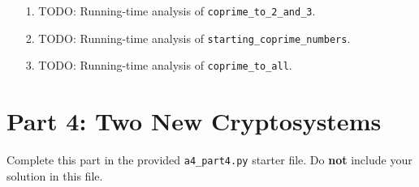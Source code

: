 \documentclass[fontsize=11pt]{article}
\begin{document}
\begin{enumerate}
\item[1.]
TODO: Running-time analysis of \texttt{coprime\_to\_2\_and\_3}.

\item[2.]
TODO: Running-time analysis of \texttt{starting\_coprime\_numbers}.

\item[3.]
TODO: Running-time analysis of \texttt{coprime\_to\_all}.
\end{enumerate}

\section*{Part 4: Two New Cryptosystems}

Complete this part in the provided \texttt{a4\_part4.py} starter file.
Do \textbf{not} include your solution in this file.
\end{document}
